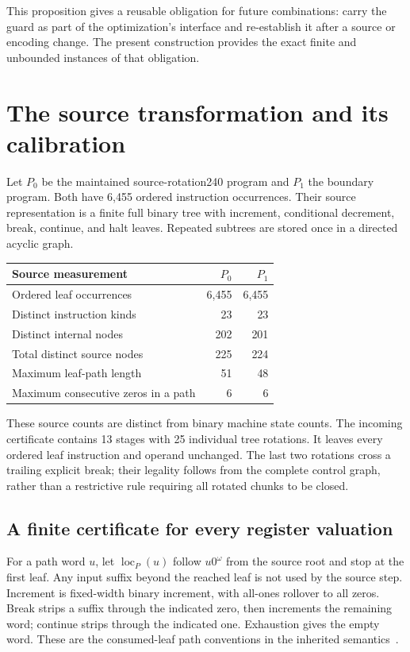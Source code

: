 \documentclass[11pt,letterpaper]{article}
\theoremstyle{definition}\newtheorem{definition}[theorem]{Definition}
\newcommand{\file}[1]{\texttt{\path{#1}}}
\begin{document}
This proposition gives a reusable obligation for future combinations:
carry the guard as part of the optimization's interface and re-establish
it after a source or encoding change.  The present construction provides
the exact finite and unbounded instances of that obligation.

\section{The source transformation and its calibration}
\label{sec:source}

Let $P_0$ be the maintained source-rotation240 program and $P_1$ the
boundary program.  Both have 6,455 ordered instruction occurrences.  Their
source representation is a finite full binary tree with increment,
conditional decrement, break, continue, and halt leaves.  Repeated
subtrees are stored once in a directed acyclic graph.

\begin{center}
\begin{tabular}{lrr}
\toprule
Source measurement & $P_0$ & $P_1$\\\midrule
Ordered leaf occurrences & 6,455 & 6,455\\
Distinct instruction kinds & 23 & 23\\
Distinct internal nodes & 202 & 201\\
Total distinct source nodes & 225 & 224\\
Maximum leaf-path length & 51 & 48\\
Maximum consecutive zeros in a path & 6 & 6\\
\bottomrule
\end{tabular}
\end{center}

These source counts are distinct from binary machine state counts.  The
incoming certificate contains 13 stages with 25 individual tree rotations.
It leaves every ordered leaf instruction and operand unchanged.  The last
two rotations cross a trailing explicit break; their legality follows
from the complete control graph, rather than a restrictive rule requiring
all rotated chunks to be closed.

\subsection{A finite certificate for every register valuation}

For a path word $u$, let $\operatorname{loc}_P(u)$ follow $u0^\omega$
from the source root and stop at the first leaf.  Any input suffix beyond
the reached leaf is not used by the source step.  Increment is fixed-width
binary increment, with all-ones rollover to all zeros.  Break strips a
suffix through the indicated zero, then increments the remaining word;
continue strips through the indicated one.  Exhaustion gives the empty
word.  These are the consumed-leaf path conventions in the inherited
\file{RegisterPath.lean} semantics~\cite{registerpath}.
\end{document}
